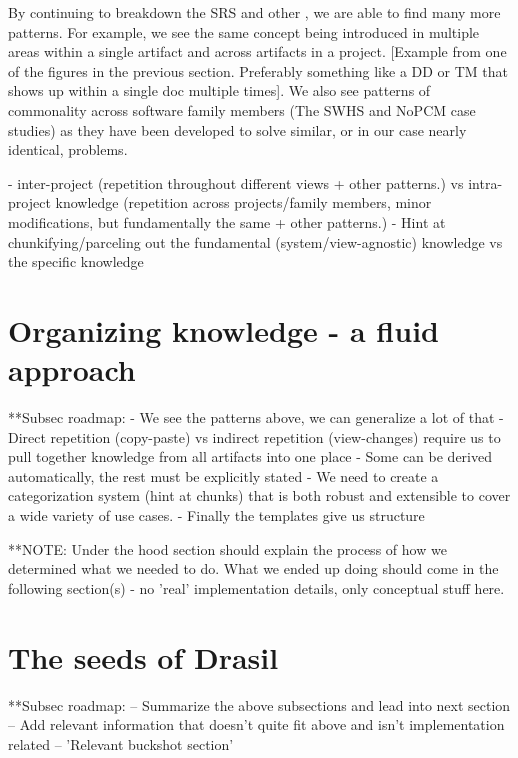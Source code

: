 By continuing to breakdown the SRS and other \sfs{}, we are able to find many 
more patterns. For example, we see the same concept being introduced in 
multiple areas within a single artifact and across artifacts in a project. 
[Example from one of the figures in the previous section. Preferably something 
like a DD or TM that shows up within a single doc multiple times]. We also see 
patterns of commonality across software family members (The SWHS and NoPCM case 
studies) as they have been developed to solve similar, or in our case nearly 
identical, problems.

- inter-project (repetition throughout different views + other patterns.)
  vs intra-project knowledge (repetition across projects/family members,
  minor modifications, but fundamentally the same + other patterns.)
- Hint at chunkifying/parceling out the fundamental (system/view-agnostic)
knowledge vs the specific knowledge

\section{Organizing knowledge - a fluid approach}
  **Subsec roadmap:
    - We see the patterns above, we can generalize a lot of that
    - Direct repetition (copy-paste) vs indirect repetition (view-changes)
    require us to pull together knowledge from all artifacts into one place
    - Some can be derived automatically, the rest must be explicitly stated
    - We need to create a categorization system (hint at chunks) that is both
    robust and extensible to cover a wide variety of use cases.
    - Finally the templates give us structure

  **NOTE: Under the hood section should explain the process of how we determined
  what we needed to do. What we ended up doing should come in the following
  section(s) - no 'real' implementation details, only conceptual stuff here.
  
\section{The seeds of Drasil}
  **Subsec roadmap:
    -- Summarize the above subsections and lead into next section
    -- Add relevant information that doesn't quite fit above 
      and isn't implementation related
    -- 'Relevant buckshot section'
